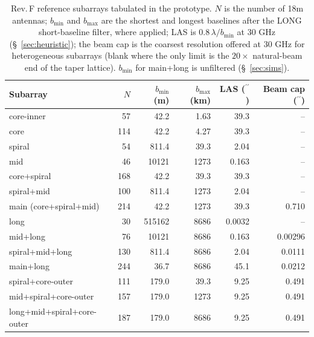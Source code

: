 \documentclass[11pt]{article}
\newcommand{\arcsec}{^{\prime\prime}}
\begin{document}
\begin{table}[tb]
\centering
\small
\caption{Rev.\,F reference subarrays tabulated in the prototype.
  $N$ is the number of 18m antennas; $b_{\min}$ and $b_{\max}$ are
  the shortest and longest baselines after the LONG short-baseline
  filter, where applied; LAS is $0.8\,\lambda/b_{\min}$ at 30 GHz
  (\S~\ref{sec:heuristic}); the beam cap is the coarsest resolution
  offered at 30 GHz for heterogeneous subarrays (blank where the only
  limit is the $20\times$ natural-beam end of the taper lattice).
  $b_{\min}$ for main+long is unfiltered (\S~\ref{sec:sims}).}
\label{tab:subarrays}
\begin{tabular}{@{}lrrrrr@{}}
\toprule
Subarray & $N$ & $b_{\min}$ (m) & $b_{\max}$ (km) & LAS ($\arcsec$) & Beam cap ($\arcsec$) \\
\midrule
core-inner                 &  57 &    42.2 &     1.63 & 39.3   & --      \\
core                       & 114 &    42.2 &     4.27 & 39.3   & --      \\
spiral                     &  54 &   811.4 &    39.3  & 2.04   & --      \\
mid                        &  46 & 10121   &  1273    & 0.163  & --      \\
core+spiral                & 168 &    42.2 &    39.3  & 39.3   & --      \\
spiral+mid                 & 100 &   811.4 &  1273    & 2.04   & --      \\
main (core+spiral+mid)     & 214 &    42.2 &  1273    & 39.3   & 0.710   \\
long                       &  30 & 515162  &  8686    & 0.0032 & --      \\
mid+long                   &  76 & 10121   &  8686    & 0.163  & 0.00296 \\
spiral+mid+long            & 130 &   811.4 &  8686    & 2.04   & 0.0111  \\
main+long                  & 244 &    36.7 &  8686    & 45.1   & 0.0212  \\
spiral+core-outer          & 111 &   179.0 &    39.3  & 9.25   & 0.491   \\
mid+spiral+core-outer      & 157 &   179.0 &  1273    & 9.25   & 0.491   \\
long+mid+spiral+core-outer & 187 &   179.0 &  8686    & 9.25   & 0.491   \\
\bottomrule
\end{tabular}
\end{table}
\end{document}
